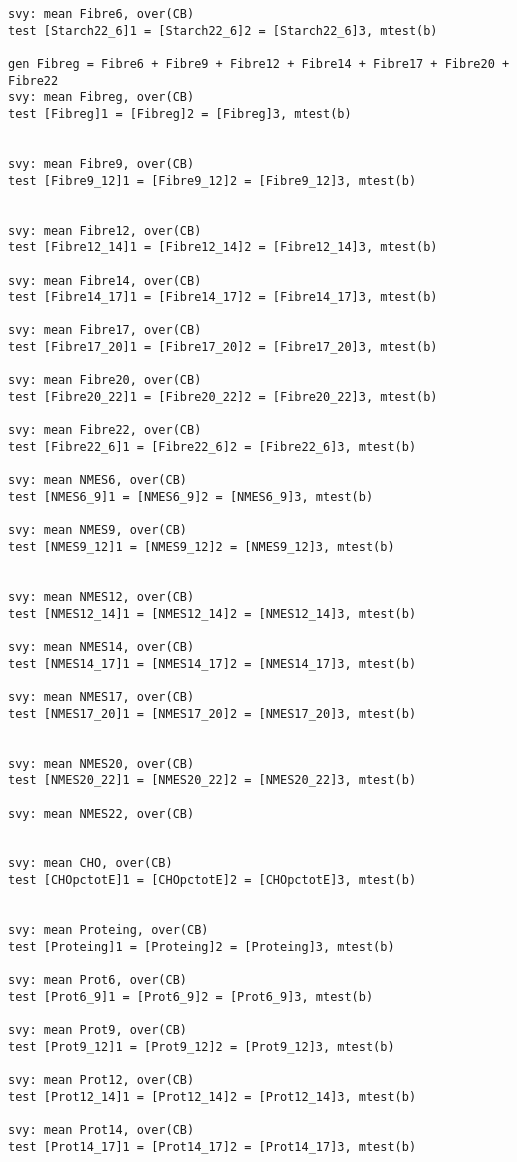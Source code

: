 \documentclass[]{article}
\begin{document}
\begin{verbatim}
svy: mean Fibre6, over(CB)
test [Starch22_6]1 = [Starch22_6]2 = [Starch22_6]3, mtest(b) 

gen Fibreg = Fibre6 + Fibre9 + Fibre12 + Fibre14 + Fibre17 + Fibre20 + Fibre22
svy: mean Fibreg, over(CB)
test [Fibreg]1 = [Fibreg]2 = [Fibreg]3, mtest(b) 


svy: mean Fibre9, over(CB)
test [Fibre9_12]1 = [Fibre9_12]2 = [Fibre9_12]3, mtest(b) 


svy: mean Fibre12, over(CB)
test [Fibre12_14]1 = [Fibre12_14]2 = [Fibre12_14]3, mtest(b) 

svy: mean Fibre14, over(CB)
test [Fibre14_17]1 = [Fibre14_17]2 = [Fibre14_17]3, mtest(b) 

svy: mean Fibre17, over(CB)
test [Fibre17_20]1 = [Fibre17_20]2 = [Fibre17_20]3, mtest(b) 

svy: mean Fibre20, over(CB)
test [Fibre20_22]1 = [Fibre20_22]2 = [Fibre20_22]3, mtest(b) 

svy: mean Fibre22, over(CB)
test [Fibre22_6]1 = [Fibre22_6]2 = [Fibre22_6]3, mtest(b) 

svy: mean NMES6, over(CB)
test [NMES6_9]1 = [NMES6_9]2 = [NMES6_9]3, mtest(b) 

svy: mean NMES9, over(CB)
test [NMES9_12]1 = [NMES9_12]2 = [NMES9_12]3, mtest(b) 


svy: mean NMES12, over(CB)
test [NMES12_14]1 = [NMES12_14]2 = [NMES12_14]3, mtest(b) 

svy: mean NMES14, over(CB)
test [NMES14_17]1 = [NMES14_17]2 = [NMES14_17]3, mtest(b) 

svy: mean NMES17, over(CB)
test [NMES17_20]1 = [NMES17_20]2 = [NMES17_20]3, mtest(b) 


svy: mean NMES20, over(CB)
test [NMES20_22]1 = [NMES20_22]2 = [NMES20_22]3, mtest(b) 

svy: mean NMES22, over(CB)


svy: mean CHO, over(CB)
test [CHOpctotE]1 = [CHOpctotE]2 = [CHOpctotE]3, mtest(b) 


svy: mean Proteing, over(CB)
test [Proteing]1 = [Proteing]2 = [Proteing]3, mtest(b) 

svy: mean Prot6, over(CB)
test [Prot6_9]1 = [Prot6_9]2 = [Prot6_9]3, mtest(b) 

svy: mean Prot9, over(CB)
test [Prot9_12]1 = [Prot9_12]2 = [Prot9_12]3, mtest(b) 

svy: mean Prot12, over(CB)
test [Prot12_14]1 = [Prot12_14]2 = [Prot12_14]3, mtest(b) 

svy: mean Prot14, over(CB)
test [Prot14_17]1 = [Prot14_17]2 = [Prot14_17]3, mtest(b) 


\end{verbatim}
\end{document}
